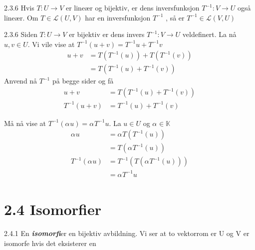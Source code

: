 \documentclass[a4paper,norsk]{article}
\begin{document}
\begin{propositionbox}{2.3.6}{}
Hvis $ T: U \rightarrow V $ er lineær og bijektiv, er dens inversfunksjon $ T^{-1} : V \rightarrow U $ også lineær. Om $ T \in  \mathcal{L} \left(  U, V \right)  $ har en inversfunksjon $ T^{-1} $ , så er $ T^{-1} \in \mathcal{L} \left( V, U \right)  $

\begin{proofbox}{2.3.6}{}
Siden $ T: U \rightarrow V $ er bijektiv er dens invers $ T^{-1}: V \rightarrow U $ veldefinert. La nå $ u, v \in  U $. Vi vile vise at $ T^{-1} \left( u + v \right) = T^{-1} u + T^{-1} v $ 
\begin{align*}
  u + v &= T \left( T^{-1} \left( u \right)  \right) + T \left( T^{-1} \left( v \right)  \right) \\
  &= T \left( T^{-1} \left( u \right) + T^{-1} \left(  v \right)   \right)
\end{align*}
Anvend nå $ T^{-1} $ på begge sider og få
\begin{align*}
  u + v &= T \left( T^{-1} \left( u \right) + T^{-1} \left(  v \right)   \right)\\
  T^{-1} \left( u + v \right) &= T^{-1} \left( u \right) + T^{-1} \left(  v \right)
\end{align*}


Må nå vise at $ T^{-1} \left( \alpha_{}^{} u \right) = \alpha_{}^{} T^{-1} u $. La $ u \in  U $ og $ \alpha_{}^{} \in  \mathbb{K} $ 
\begin{align*}
  \alpha_{}^{} u &= \alpha_{}^{} T \left( T^{-1} \left( u \right)  \right) \\
  &= T \left(  \alpha_{}^{} T^{-1} \left(  u \right)  \right) \\
  T^{-1} \left( \alpha_{}^{} u \right) &= T^{-1} \left( T \left( \alpha_{}^{} T^{-1} \left( u \right)  \right)  \right) \\
  &= \alpha_{}^{} T^{-1} u
\end{align*}
\end{proofbox}
\end{propositionbox}


\section*{2.4 Isomorfier}

\begin{definitionbox}{2.4.1}{}
En \textbf{\textit{isomorfi}}er en bijektiv avbildning. Vi ser at to vektorrom er U og V er isomorfe hvis det eksisterer en 
\end{definitionbox}
\end{document}
